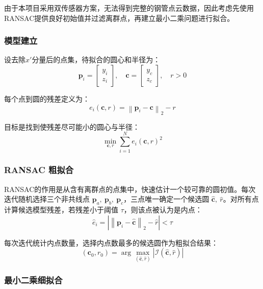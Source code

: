 \documentclass{article}
\let\oldcite\cite
\renewcommand{\cite}[1]{\oldcite{#1}}
\begin{document}
由于本项目采用双传感器方案，无法得到完整的钢管点云数据，因此考虑先使用RANSAC提供良好初始值并过滤离群点，再建立最小二乘问题进行拟合。

\subsubsection{模型建立}

设去除$x'$分量后的点集，待拟合的圆心和半径为：
\begin{equation}
    \mathbf{p}_i =
    \begin{bmatrix} y_i \\ z_i \end{bmatrix}, \quad
    \mathbf{c} =
    \begin{bmatrix} y_c \\ z_c \end{bmatrix}, \quad r > 0
\end{equation}

每个点到圆的残差定义为：
\begin{equation}
    e_i(\mathbf{c}, r) = \left\| \mathbf{p}_i - \mathbf{c} \right\|_2 - r
\end{equation}

目标是找到使残差尽可能小的圆心与半径：
\begin{equation}
    \min_{\mathbf{c}, r} \sum_{i=1}^{N} e_i(\mathbf{c}, r)^2
\end{equation}

\subsubsection{RANSAC 粗拟合}

RANSAC的作用是从含有离群点的点集中，快速估计一个较可靠的圆初值\cite{ransac}。每次迭代随机选择三个非共线点 $\mathbf{p}_a,\ \mathbf{p}_b,\ \mathbf{p}_c$，三点唯一确定一个候选圆 $\hat{\mathbf{c}},\ \hat{r}$。对所有点计算候选模型残差，若残差小于阈值 $\tau$，则该点被认为是内点：
\begin{equation}
    \hat{e}_i = \left| \left\| \mathbf{p}_i - \hat{\mathbf{c}} \right\|_2 - \hat{r} \right| < \tau
\end{equation}

每次迭代统计内点数量，选择内点数最多的候选圆作为粗拟合结果：
\begin{equation}
    (\mathbf{c}_0, r_0) =
    \arg\max_{(\hat{\mathbf{c}}, \hat{r})}
    \left| \mathcal{I}(\hat{\mathbf{c}}, \hat{r}) \right|
\end{equation}

\subsubsection{最小二乘细拟合}
\end{document}
